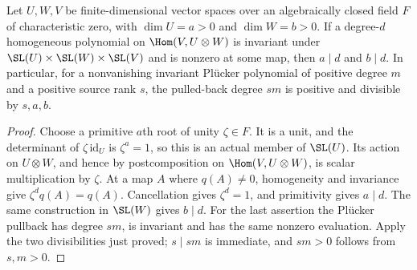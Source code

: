 \begin{lemma}
\label{lem:invariant-degree-divisibility}
\leanok
Let $U,W,V$ be finite-dimensional vector spaces over an algebraically closed
field $F$ of characteristic zero, with $\dim U=a>0$ and $\dim W=b>0$.
If a degree-$d$ homogeneous polynomial on $\Hom(V,U\otimes W)$ is invariant
under $\SL(U)\times\SL(W)\times\SL(V)$ and is nonzero at some map, then
$a\mid d$ and $b\mid d$.
In particular, for a nonvanishing invariant Pl\"ucker polynomial of positive
degree $m$ and a positive source rank $s$, the pulled-back degree $sm$ is
positive and divisible by $s,a,b$.
\end{lemma}
\begin{proof}
Choose a primitive $a$th root of unity $\zeta\in F$. It is a unit, and
the determinant of $\zeta\,\mathrm{id}_U$ is $\zeta^a=1$, so this is
an actual member of $\SL(U)$. Its action on $U\otimes W$, and hence by
postcomposition on $\Hom(V,U\otimes W)$, is scalar multiplication by
$\zeta$. At a map $A$ where $q(A)\ne0$, homogeneity and invariance give
$\zeta^d q(A)=q(A)$. Cancellation gives $\zeta^d=1$, and primitivity
gives $a\mid d$. The same construction in $\SL(W)$ gives $b\mid d$.
For the last assertion the Pl\"ucker pullback has degree $sm$, is invariant
and has the same nonzero evaluation. Apply the two divisibilities just
proved; $s\mid sm$ is immediate, and $sm>0$ follows from $s,m>0$.
\end{proof}

